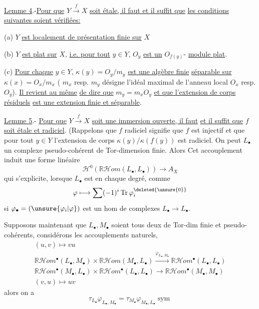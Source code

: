 \uline{Lemme 4}.-\uline{Pour que} $Y\xrightarrow{f}X$ \uline{soit étale, il faut et il suffit que}
\uline{les conditions suivantes soient vérifiées:}

(a) $Y$ \uline{est localement de présentation finie sur} $X$

(b) $Y$ \uline{est plat sur} $X$, \uline{i.e. pour tout} $y\in Y$, $O_y$ \uline{est un} $O_{f(y)}$-
\uline{module plat}.

(c) \uline{Pour chaque} $y\in Y$, $\kappa(y)=O_y/m_y$ \uline{est une algèbre finie}
\uline{séparable sur} $\kappa(x)=O_x/m_x$ ( $m_x$ resp. $m_y$ désigne l'idéal
maximal de l'anneau local $O_x$ resp. $O_y$). \uline{Il revient au même}
\uline{de dire que} $m_y=m_xO_y$ \uline{et que l'extension de corps résiduels} 
\uline{est une extension finie et séparable}.

\uline{Lemme 5}.- \uline{Pour que} $Y\xrightarrow{f}X$ \uline{soit une immersion ouverte, il faut}
\uline{et il suffit que} $f$ \uline{soit étale et radiciel}. (Rappelons que $f$
radiciel signifie que $f$ est injectif et que pour tout $y\in Y$
l'extension de corps $\kappa(y)/\kappa(f(y))$ est radiciel. On peut
$L_\bullet$ un complexe pseudo-cohérent de Tor-dimension
finie. Alors
Cet accouplement induit une forme linéaire
\[
\mathcal H^0(\mathbb R\mathcal Hom(L_\bullet,L_\bullet))\longrightarrow A_X
\]
qui s'explicite, lorsque $L_\bullet$ est  en chaque
degré, comme
\[
\varphi\longmapsto\sum(-1)^i\operatorname{Tr}\varphi_i^{\deleted{\unsure{0}}}
\]
si $\varphi_\bullet=(\unsure{\varphi_i|\varphi})$ est  un hom de
complexes $L_\bullet\longrightarrow L_\bullet$.
\deleted{[Regardons en effet}

Supposons maintenant que $L_\bullet,M_\bullet$
soient tous deux de Tor-dim finie
et pseudo-cohérents, considérons les accouplements
naturels,
\[
\begin{gathered}
(u,v)\longmapsto vu\\
\mathbb R\mathcal Hom^\bullet(L_\bullet,M_\bullet)\times\mathbb R\mathcal Hom(M_\bullet,L_\bullet)\xrightarrow{\varphi_{L_\bullet,M_\bullet}}\mathbb R\mathcal Hom^\bullet(L_\bullet,L_\bullet)\\
\mathbb R\mathcal Hom^\bullet(M_\bullet,L_\bullet)\times\mathbb R\mathcal Hom^\bullet(L_\bullet,L_\bullet)\longrightarrow\mathbb R\mathcal Hom^\bullet(M_\bullet,M_\bullet)\\
(v,u)\longmapsto uv
\end{gathered}
\]
alors  on a
\[
\tau_{L_\bullet}\varphi_{L_\bullet,M_\bullet}=\tau_{M_\bullet}\varphi_{M_\bullet,L_\bullet}\operatorname{sym}
\]
